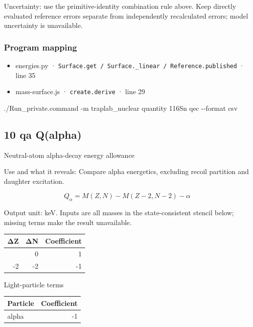 \documentclass[
  11pt,
  letterpaper,
]{article}
\newenvironment{Shaded}{}{}
\newcommand{\AttributeTok}[1]{\textcolor[rgb]{0.49,0.56,0.16}{#1}}
\newcommand{\ExtensionTok}[1]{#1}
\newcommand{\NormalTok}[1]{#1}
\providecommand{\tightlist}{%
  \setlength{\itemsep}{0pt}\setlength{\parskip}{0pt}}
\begin{document}
Uncertainty: use the primitive-identity combination rule above. Keep
directly evaluated reference errors separate from independently
recalculated errors; model uncertainty is unavailable.

\subsubsection{Program mapping}\label{program-mapping-8}

\begin{itemize}
\tightlist
\item
  energies.py ·
  \texttt{Surface.get\ /\ Surface.\_linear\ /\ Reference.published} ·
  line 35
\item
  mass-surface.js · \texttt{create.derive} · line 29
\end{itemize}

\begin{Shaded}
\begin{Highlighting}[]
\ExtensionTok{./Run\_private.command} \AttributeTok{{-}m}\NormalTok{ traplab\_nuclear quantity 116Sn qec }\AttributeTok{{-}{-}format}\NormalTok{ csv}
\end{Highlighting}
\end{Shaded}

\subsection{10 qa Q(alpha)}\label{qa-qalpha}

Neutral-atom alpha-decay energy allowance

Use and what it reveals: Compare alpha energetics, excluding recoil
partition and daughter excitation.

\[
Q_\alpha=M(Z,N)-M(Z-2,N-2)-\alpha
\]

Output unit: keV. Inputs are all masses in the state-consistent stencil
below; missing terms make the result unavailable.

\begin{longtable}[]{@{}rrr@{}}
\toprule\noalign{}
ΔZ & ΔN & Coefficient \\
\midrule\noalign{}
\endhead
\bottomrule\noalign{}
\endlastfoot
0 & 0 & 1 \\
-2 & -2 & -1 \\
\end{longtable}

Light-particle terms

\begin{longtable}[]{@{}lr@{}}
\toprule\noalign{}
Particle & Coefficient \\
\midrule\noalign{}
\endhead
\bottomrule\noalign{}
\endlastfoot
alpha & -1 \\
\end{longtable}
\end{document}
